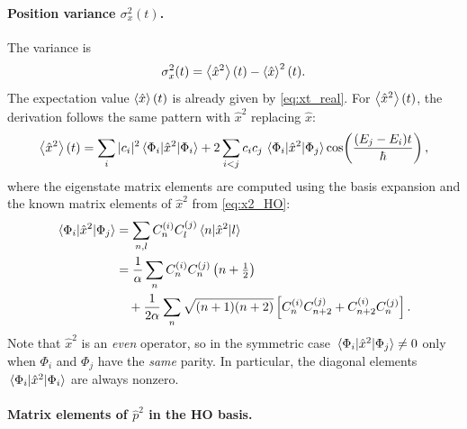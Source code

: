 \paragraph{Position variance $\sigma_x^2(t)$.}

The variance is
\begin{equation}
  \sigma_x^2(t) = \expval{\hat{x}^2}(t) - \expval{\hat{x}}^2(t).
\end{equation}
The expectation value $\expval{\hat{x}}(t)$ is already given by \cref{eq:xt_real}.
For $\expval{\hat{x}^2}(t)$, the derivation follows the same pattern with $\hat{x}^2$ replacing $\hat{x}$:
\begin{equation}\label{eq:x2exp}
  \expval{\hat{x}^2}(t)
  = \sum_i |c_i|^2 \mel{\Phi_i}{\hat{x}^2}{\Phi_i}
  + 2\sum_{i<j} c_i c_j\,\mel{\Phi_i}{\hat{x}^2}{\Phi_j}\cos\!\left(\frac{(E_j - E_i)t}{\hbar}\right),
\end{equation}
where the eigenstate matrix elements are computed using the basis expansion and the known matrix elements of $\hat{x}^2$ from \cref{eq:x2_HO}:
\begin{align}
  \mel{\Phi_i}{\hat{x}^2}{\Phi_j}
  &= \sum_{n,l} C_n^{(i)} C_l^{(j)} \mel{n}{\hat{x}^2}{l}\notag\\
  &= \frac{1}{\alpha}\sum_n C_n^{(i)}C_n^{(j)}\left(n + \tfrac{1}{2}\right)\notag\\
  &\quad + \frac{1}{2\alpha}\sum_n \sqrt{(n+1)(n+2)}\left[C_n^{(i)}C_{n+2}^{(j)} + C_{n+2}^{(i)}C_n^{(j)}\right].
  \label{eq:x2_eigenstate}
\end{align}
Note that $\hat{x}^2$ is an \emph{even} operator, so in the symmetric case $\mel{\Phi_i}{\hat{x}^2}{\Phi_j} \neq 0$ only when $\Phi_i$ and $\Phi_j$ have the \emph{same} parity. In particular, the diagonal elements $\mel{\Phi_i}{\hat{x}^2}{\Phi_i}$ are always nonzero.

\paragraph{Matrix elements of $\hat{p}^2$ in the HO basis.}

